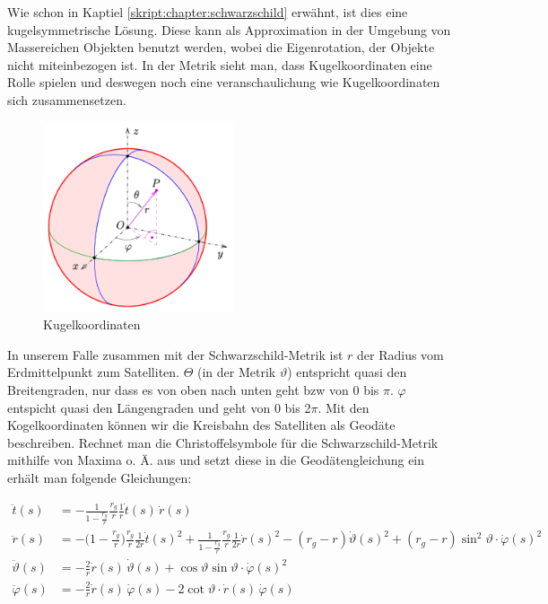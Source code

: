 \begin{refsection}
\noindent{}Wie schon in Kaptiel \ref{skript:chapter:schwarzschild} erwähnt, ist dies eine kugelsymmetrische Lösung. Diese kann als Approximation in der Umgebung von Massereichen Objekten benutzt werden, wobei die Eigenrotation, der Objekte nicht miteinbezogen ist. In der Metrik sieht man, dass Kugelkoordinaten eine Rolle spielen und deswegen noch eine veranschaulichung wie Kugelkoordinaten sich zusammensetzen.

\begin{figure}[h]
    \centering
    \includegraphics[width=0.5\textwidth]{gps/pictures/kugelkoordinaten.png}
    \caption{Kugelkoordinaten}
\end{figure}

In unserem Falle zusammen mit der Schwarzschild-Metrik ist \( r \) der Radius vom Erdmittelpunkt zum Satelliten. \( \Theta \) (in der Metrik \( \vartheta \)) entspricht quasi den Breitengraden, nur dass es von oben nach unten geht bzw von 0 bis \( \pi \). \( \varphi \) entspicht quasi den Längengraden und geht von 0 bis 2\( \pi \). Mit den Kogelkoordinaten können wir die Kreisbahn des Satelliten als Geodäte beschreiben. Rechnet man die Christoffelsymbole für die Schwarzschild-Metrik mithilfe von Maxima o. Ä. aus und setzt diese in die Geodätengleichung ein erhält man folgende Gleichungen:

\begin{align*}
\ddot t(s)
&=
-\frac{1}{1-\displaystyle\frac{r_g}{r}}\frac{r_g}{r}\frac{1}{r}\dot t(s)\,\dot r(s)
\\
\ddot r(s)
&=
-\biggl(1-\frac{r_g}{r}\biggr)\frac{r_g}{r}\frac1{2r}\dot t(s)^2
+\frac{1}{1-\displaystyle\frac{r_g}{r}} \frac{r_g}{r}\frac1{2r}\dot r(s)^2
-(r_g-r)\dot \vartheta(s)^2 + (r_g-r)\sin^2 \vartheta \cdot \dot \varphi(s)^2
\\
\ddot \vartheta(s)
&=
-\frac{2}{r} \dot r(s)\, \dot \vartheta(s)
+\cos\vartheta\sin\vartheta \cdot \dot\varphi(s)^2
\\
\ddot \varphi(s)
&=
-\frac{2}{r} \dot r(s)\,\dot \varphi(s)
-2\cot\vartheta \cdot \dot r(s)\,\dot\varphi(s)
\end{align*}


\end{refsection}
